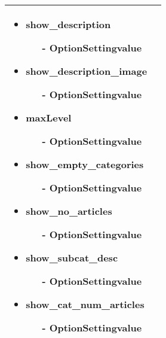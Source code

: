 \begin{minipage}{0.7\textwidth}
\begin{tabular}{|p{} | p{}|}
\begin{itemize}
\begin{enumerate}
		\end{enumerate} 
	\item show\_description
	\begin{enumerate}
		\item[-] OptionSettingvalue
	\end{enumerate}
	\item show\_description\_image
	\begin{enumerate}
		\item[-] OptionSettingvalue
	\end{enumerate} 
	\item maxLevel
	\begin{enumerate}
		\item[-] OptionSettingvalue
	\end{enumerate} 
	\item show\_empty\_categories
	\begin{enumerate}
			\item[-] OptionSettingvalue
	\end{enumerate}
	\item show\_no\_articles
	\begin{enumerate}
		\item[-] OptionSettingvalue
	\end{enumerate} 
	\item show\_subcat\_desc
	\begin{enumerate}
		\item[-] OptionSettingvalue
	\end{enumerate}
	\item show\_cat\_num\_articles
	\begin{enumerate}
		\item[-] OptionSettingvalue
	\end{enumerate} 
\end{itemize}
\\
\hline
\end{tabular}
\end{minipage}

